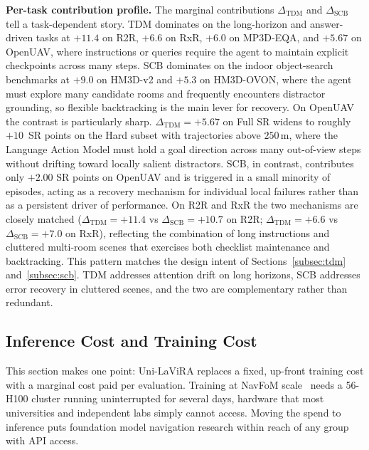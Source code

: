 \documentclass[conference]{IEEEtran}
\newcommand{\ourmethod}{Uni-LaViRA\xspace}
\begin{document}
\noindent\textbf{Per-task contribution profile.}
The marginal contributions $\Delta_{\mathrm{TDM}}$ and
$\Delta_{\mathrm{SCB}}$ tell a task-dependent story.
TDM dominates on the long-horizon and answer-driven
tasks at $+11.4$ on R2R, $+6.6$ on RxR, $+6.0$ on MP3D-EQA, and
$+5.67$ on OpenUAV, where instructions or queries require the agent
to maintain explicit checkpoints across many steps. SCB dominates on
the indoor object-search benchmarks at $+9.0$ on HM3D-v2 and $+5.3$
on HM3D-OVON, where the agent must explore many candidate rooms and
frequently encounters distractor grounding, so flexible backtracking
is the main lever for recovery.
On OpenUAV the contrast is particularly
sharp.
$\Delta_{\mathrm{TDM}}{=}+5.67$ on Full SR widens to roughly
$+10$~SR points on the Hard subset with trajectories above $250$\,m,
where the Language Action Model must hold a goal direction across
many out-of-view steps without drifting toward locally salient
distractors.  SCB, in contrast, contributes only $+2.00$ SR points
on OpenUAV and is triggered in a small minority of episodes,
acting as a recovery mechanism for individual local failures
rather than as a persistent driver of performance.
On R2R and RxR the two mechanisms are closely matched
($\Delta_{\mathrm{TDM}}{=}+11.4$ vs $\Delta_{\mathrm{SCB}}{=}+10.7$
on R2R; $\Delta_{\mathrm{TDM}}{=}+6.6$ vs $\Delta_{\mathrm{SCB}}{=}+7.0$
on RxR), reflecting the combination of long instructions and cluttered
multi-room scenes that exercises both checklist maintenance and
backtracking.  This pattern matches the design intent of
Sections~\ref{subsec:tdm} and~\ref{subsec:scb}.  TDM addresses attention drift
on long horizons, SCB addresses error recovery in cluttered scenes, and the
two are complementary rather than redundant.

\subsection{Inference Cost and Training Cost}
\label{subsec:efficiency}

This section makes one point: \ourmethod replaces a
fixed, up-front training cost with a marginal cost paid per evaluation.
Training at NavFoM scale~\cite{zhang2025navfom} needs a \mbox{56-H100}
cluster running uninterrupted for several days, hardware that most
universities and independent labs simply cannot access. Moving the
spend to inference puts foundation model navigation research within
reach of any group with API access.
\end{document}
